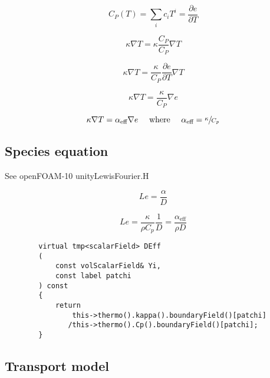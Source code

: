 \documentclass[a4paper, 12pt]{article}
\numberwithin{equation}{section}
\newcommand{\code}{\fontfamily{pcr}\selectfont}
\begin{document}
        \begin{equation}
        C_P (T) = \sum_i c_i T^i = \frac{\partial e}{\partial T}
        \end{equation}

        \begin{equation}
        \kappa \nabla T = \kappa \frac{C_P}{C_P} \nabla T
        \end{equation}

        \begin{equation}
        \kappa \nabla T = \frac{\kappa}{C_P} \frac{\partial e}{\partial T} \nabla T
        \end{equation}

        \begin{equation}
        \kappa \nabla T = \frac{\kappa}{C_P} \nabla e
        \end{equation}

        \begin{equation}
        \kappa \nabla T = \alpha_\text{eff} \nabla e \quad \text{ where } \quad  \alpha_\text{eff} = \sfrac{\kappa}{C_p}
        \end{equation}

    \subsection{Species equation}

        See openFOAM-10 {\code unityLewisFourier.H}

        \begin{equation}
        Le = \frac{\alpha}{D}
        \end{equation}

        \begin{equation}
        Le = \frac{\kappa}{\rho C_p} \frac{1}{D} = \frac{\alpha_\text{eff}}{\rho D}
        \end{equation}

    {
    \begin{verbatim}
        virtual tmp<scalarField> DEff
        (
            const volScalarField& Yi,
            const label patchi
        ) const
        {
            return
                this->thermo().kappa().boundaryField()[patchi]
               /this->thermo().Cp().boundaryField()[patchi];
        }
    \end{verbatim}
    }

    \subsection{Transport model}
\end{document}
